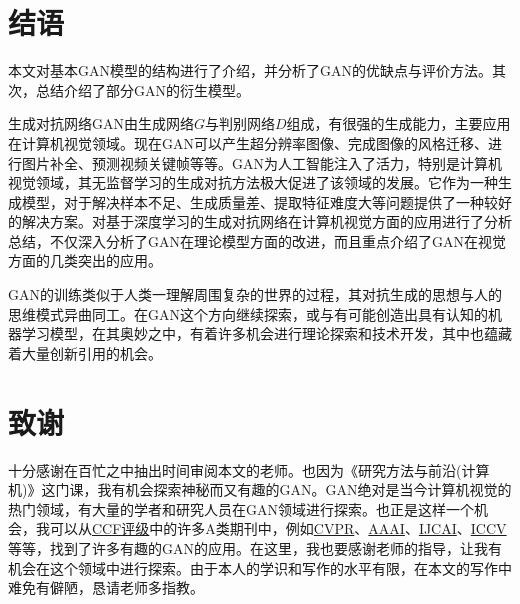\documentclass[lang=cn,a4paper,12pt,bibend=biber]{GAN}
\begin{document}
\section{结语}

本文对基本GAN模型的结构进行了介绍，并分析了GAN的优缺点与评价方法。其次，总结介绍了部分GAN的衍生模型。

生成对抗网络GAN由生成网络$G$与判别网络$D$组成，有很强的生成能力，主要应用在计算机视觉领域。现在GAN可以产生超分辨率图像、完成图像的风格迁移、进行图片补全、预测视频关键帧等等。GAN为人工智能注入了活力，特别是计算机视觉领域，其无监督学习的生成对抗方法极大促进了该领域的发展。它作为一种生成模型，对于解决样本不足、生成质量差、提取特征难度大等问题提供了一种较好的解决方案。对基于深度学习的生成对抗网络在计算机视觉方面的应用进行了分析总结，不仅深入分析了GAN在理论模型方面的改进，而且重点介绍了GAN在视觉方面的几类突出的应用。

GAN的训练类似于人类一理解周围复杂的世界的过程，其对抗生成的思想与人的思维模式异曲同工。在GAN这个方向继续探索，或与有可能创造出具有认知的机器学习模型，在其奥妙之中，有着许多机会进行理论探索和技术开发，其中也蕴藏着大量创新引用的机会。

\section{致谢}

十分感谢在百忙之中抽出时间审阅本文的老师。也因为《研究方法与前沿(计算机)》这门课，我有机会探索神秘而又有趣的GAN。GAN绝对是当今计算机视觉的热门领域，有大量的学者和研究人员在GAN领域进行探索。也正是这样一个机会，我可以从\href{https://www.ccf.org.cn/c/2019-04-25/663625.shtml}{CCF评级}中的许多A类期刊中，例如\href{https://cvpr2022.thecvf.com/}{CVPR}、\href{https://www.aaai.org/Conferences/AAAI-22/}{AAAI}、\href{https://www.ijcai.org/}{IJCAI}、\href{https://www.ijcai.org/}{ICCV}等等，找到了许多有趣的GAN的应用。在这里，我也要感谢老师的指导，让我有机会在这个领域中进行探索。由于本人的学识和写作的水平有限，在本文的写作中难免有僻陋，恳请老师多指教。

\newpage
\nocite{*}
\printbibliography[heading=bibintoc, title=\ebibname]

\appendix
\addappheadtotoc
\end{document}
